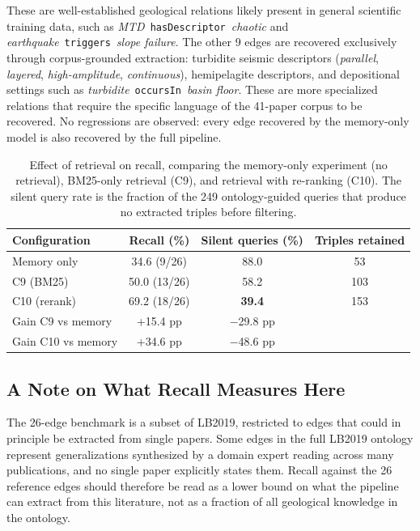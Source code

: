 \documentclass[10pt]{article}
\newcommand{\pred}[1]{\texttt{\small #1}}
\begin{document}
These are well-established geological relations likely present in
general scientific training data, such as
\emph{MTD}~\pred{hasDescriptor}~\emph{chaotic} and
\emph{earthquake}~\pred{triggers}~\emph{slope failure}.
The other 9 edges are recovered exclusively through corpus-grounded
extraction: turbidite seismic descriptors (\emph{parallel},
\emph{layered}, \emph{high-amplitude}, \emph{continuous}),
hemipelagite descriptors, and depositional settings such as
\emph{turbidite}~\pred{occursIn}~\emph{basin floor}.
These are more specialized relations that require the specific
language of the 41-paper corpus to be recovered.
No regressions are observed: every edge recovered by the memory-only
model is also recovered by the full pipeline.

\begin{table}[htb]
\centering
\caption{Effect of retrieval on recall, comparing the
  memory-only experiment (no retrieval), BM25-only
  retrieval (C9), and retrieval with re-ranking (C10).
  The silent query rate is the fraction of the 249
  ontology-guided queries that produce no extracted
  triples before filtering.}
\label{tab:expb}
\small
\begin{tabular}{lccc}
\toprule
\textbf{Configuration} & \textbf{Recall (\%)} &
\textbf{Silent queries (\%)} &
\textbf{Triples retained} \\
\midrule
Memory only  & 34.6 (9/26)  & 88.0 &  53 \\
C9 (BM25)  & 50.0 (13/26) & 58.2 & 103 \\
C10 (rerank) & 69.2 (18/26) & \textbf{39.4} & 153 \\
\midrule
Gain C9 vs memory  & +15.4 pp & $-$29.8 pp & \\
Gain C10 vs memory & +34.6 pp & $-$48.6 pp & \\
\bottomrule
\end{tabular}
\end{table}

\subsection{A Note on What Recall Measures Here}
\label{sec:recoverability}

The 26-edge benchmark is a subset of LB2019, restricted to edges
that could in principle be extracted from single papers.
Some edges in the full LB2019 ontology represent generalizations
synthesized by a domain expert reading across many publications,
and no single paper explicitly states them.
Recall against the 26 reference edges should therefore be read as a
lower bound on what the pipeline can extract from this literature,
not as a fraction of all geological knowledge in the ontology.
\end{document}

